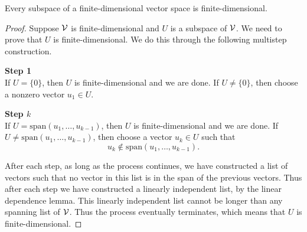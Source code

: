 \begin{theorem}
	Every subspace of a finite-dimensional vector space is finite-dimensional.
\end{theorem}
\begin{proof}
	Suppose $\mathcal{V}$ is finite-dimensional and $U$ is a subspace of $\mathcal{V}$. We need to prove that $U$ is finite-dimensional. We do this through the following multistep construction.
	
	\noindent \textbf{Step 1} \\
	If $U = \{0\}$, then $U$ is finite-dimensional and we are done. If $U \neq \{0\}$, then choose a nonzero vector $u_1 \in U$.
	
	\noindent \textbf{Step $k$} \\
	If $U = \text{span}(u_1, \dots, u_{k-1})$, then $U$ is finite-dimensional and we are done. If $U \neq \text{span}(u_1, \dots, u_{k-1})$, then choose a vector $u_k \in U$ such that
	\[
	u_k \notin \text{span}(u_1, \dots, u_{k-1}).
	\]
	
	After each step, as long as the process continues, we have constructed a list of vectors such that no vector in this list is in the span of the previous vectors. Thus after each step we have constructed a linearly independent list, by the linear dependence lemma. This linearly independent list cannot be longer than any spanning list of $\mathcal{V}$. Thus the process eventually terminates, which means that $U$ is finite-dimensional.
\end{proof}
